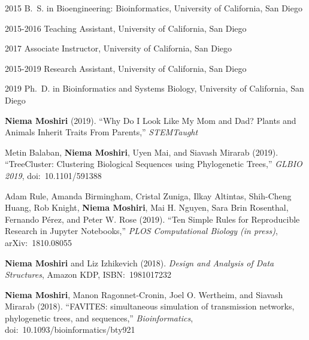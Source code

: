\begin{frontmatter}
\begin{acknowledgements}
\ackfavites

\ackdualbirth

\ackproact

\acktreeswift
\end{acknowledgements}

\begin{vitapage}
\begin{vita}
\item[2015] B.~S. in Bioengineering: Bioinformatics, University of California, San Diego
\item[2015-2016] Teaching Assistant, University of California, San Diego
\item[2017] Associate Instructor, University of California, San Diego
\item[2015-2019] Research Assistant, University of California, San Diego
\item[2019] Ph.~D. in Bioinformatics and Systems Biology, University of California, San Diego
\end{vita}
\begin{publications}
\item \textbf{Niema Moshiri} (2019). ``Why Do I Look Like My Mom and Dad? Plants and Animals Inherit Traits From Parents,'' \textit{STEMTaught}
\item Metin Balaban, \textbf{Niema Moshiri}, Uyen Mai, and Siavash Mirarab (2019). ``TreeCluster: Clustering Biological Sequences using Phylogenetic Trees,'' \textit{GLBIO 2019}, doi:~10.1101/591388
\item Adam Rule, Amanda Birmingham, Cristal Zuniga, Ilkay Altintas, Shih-Cheng Huang, Rob Knight, \textbf{Niema Moshiri}, Mai H. Nguyen, Sara Brin Rosenthal, Fernando Pérez, and Peter W. Rose (2019). ``Ten Simple Rules for Reproducible Research in Jupyter Notebooks,'' \textit{PLOS Computational Biology (in press)}, arXiv:~1810.08055
\item \textbf{Niema Moshiri} and Liz Izhikevich (2018). \textit{Design and Analysis of Data Structures}, Amazon KDP, ISBN:~1981017232
\item \textbf{Niema Moshiri}, Manon Ragonnet-Cronin, Joel O. Wertheim, and Siavash Mirarab (2018). ``FAVITES: simultaneous simulation of transmission networks, phylogenetic trees, and sequences,'' \textit{Bioinformatics}, doi:~10.1093/bioinformatics/bty921

\end{publications}
\end{vitapage}
\end{frontmatter}
